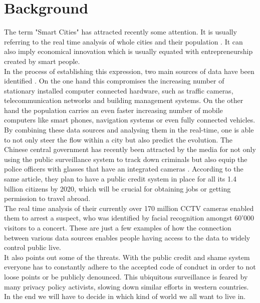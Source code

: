 \documentclass[letterpaper]{article}
\begin{document}
\section{Background}\label{sec:background}
The term "Smart Cities" has attracted recently \cite{Ferdowsi2018,Abu-Matar2018,Usman2018} some attention. It is usually referring
to the real time analysis of whole cities and their population \cite{smartCities3}. It can also imply economical
innovation which is usually equated with entrepreneurship created by smart people.\\
\indent In the process of establishing this expression, two main  sources of data have been identified \cite{smartCities3}.
On the one hand this compromises the increasing number of stationary installed computer connected hardware, such as traffic cameras,
telecommunication networks and building management systems. On the other hand the population carries an even faster increasing
number of mobile computers like smart phones, navigation systems or even fully connected vehicles.\\
\indent By combining these data sources and analysing them in the real-time, one is able to not only steer the flow within a city
but also predict the evolution. The Chinese central government has recently been attracted by the media \cite{thediplomat1} for not only
using the public surveillance system to track down criminals but also equip the police officers with glasses that have an integrated
cameras \cite{cnet1}. According to the same article, they plan to have a public credit system in place for all its 1.4 billion citizens
by 2020, which will be crucial for obtaining jobs or getting permission to travel abroad.\\
\indent The real time analysis of their currently over 170 million CCTV cameras \cite{bbc1} enabled them to arrest a suspect, who was
identified by facial recognition amongst 60'000 visitors to a concert. These are just a few examples of how the connection between various
data sources enables people having access to the data to widely control public live.\\ %
\indent It also points out some of the threats. With the public credit and shame system \cite{cnet1} everyone has to constantly
adhere to the accepted code of conduct in order to not loose points or be publicly denounced. This ubiquitous surveillance is feared
by many privacy policy activists, slowing down similar efforts in western countries. In the end we will have to decide in which kind
of world we all want to live in.\\
\end{document}
